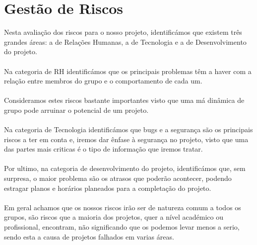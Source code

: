 \documentclass[12pt, a4paper, twoside]{report} %
\begin{document}

\clearpage


\section{Gestão de Riscos}

Nesta avaliação dos riscos para o nosso projeto, identificámos que existem três grandes áreas: a de Relações Humanas, a de Tecnologia e a de Desenvolvimento do projeto.\\\\ Na categoria de RH identificámos que os principais problemas têm a haver com a relação entre membros do grupo e o comportamento de cada um. \\\\Consideramos estes riscos bastante importantes visto que uma má dinâmica de grupo pode arruinar o potencial de um projeto.\\\\ Na categoria de Tecnologia identificámos que bugs e a segurança são os principais riscos a ter em conta e, iremos dar ênfase à segurança no projeto, visto que uma das partes mais criticas é o tipo de informação que iremos tratar.\\\\ Por ultimo, na categoria de desenvolvimento do projeto, identificámos que, sem surpresa, o maior problema são os atrasos que poderão acontecer, podendo estragar planos e horários planeados para a completação do projeto.\\\\ Em geral achamos que os nossos riscos irão ser de natureza comum a todos os grupos, são riscos que a maioria dos projetos, quer a nível académico ou profissional, encontram, não significando que os podemos levar menos a serio, sendo esta a causa de projetos falhados em varias áreas.
\end{document}
